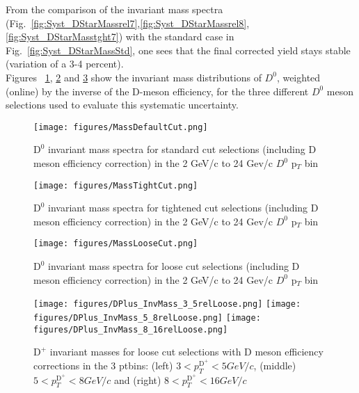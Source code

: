 From the comparison of the invariant mass spectra (Fig.~\ref{fig:Syst_DStarMassrel7},\ref{fig:Syst_DStarMassrel8},\ref{fig:Syst_DStarMasstght7}) with the standard case in Fig.~\ref{fig:Syst_DStarMassStd}, one sees that the final corrected yield stays stable (variation of a 3-4 percent). \ \\


Figures ~\ref{fig:DzeroMassPlots0}, \ref{fig:DzeroMassPlots1} and \ref{fig:DzeroMassPlots2} show the invariant mass distributions of ${D}^0$, weighted (online) by the inverse of the D-meson efficiency, for the three different ${D}^0$ meson selections used to evaluate this systematic uncertainty.
\begin{figure}[h]
\centering
{\texttt{[image: figures/MassDefaultCut.png]}}
\caption{$\text{D}^0$ invariant mass spectra for standard cut selections (including D meson efficiency correction) in the 2 GeV/c to 24 Gev/c $D^0$ p$_T$ bin}
\label{fig:DzeroMassPlots0}
\end{figure}

\begin{figure}[h]
\centering
{\texttt{[image: figures/MassTightCut.png]}}
\caption{$\text{D}^0$ invariant mass spectra for tightened cut selections (including D meson efficiency correction) in the 2 GeV/c to 24 Gev/c $D^0$ p$_T$ bin}
\label{fig:DzeroMassPlots1}
\end{figure}

\begin{figure}[h]
\centering
{\texttt{[image: figures/MassLooseCut.png]}}
\caption{$\text{D}^0$ invariant mass spectra for loose cut selections (including D meson efficiency correction) in the 2 GeV/c to 24 Gev/c $D^0$ p$_T$ bin}
\label{fig:DzeroMassPlots2}
\end{figure}

\newpage

\begin{figure}[h]
\centering
{\texttt{[image: figures/DPlus\_InvMass\_3\_5relLoose.png]}}
{\texttt{[image: figures/DPlus\_InvMass\_5\_8relLoose.png]}}
{\texttt{[image: figures/DPlus\_InvMass\_8\_16relLoose.png]}}
 \caption{$\text{D}^+$ invariant masses for loose cut selections with D meson efficiency corrections in the 3 ptbins: (left) $3< p_{T}^{\text{D}^+}< 5 GeV/c$, (middle) $5< p_{T}^{\text{D}^+}< 8 GeV/c$ and (right) $8< p_{T}^{\text{D}^+}< 16 GeV/c$}
\label{fig:Syst_DplusLoose}
\end{figure}

